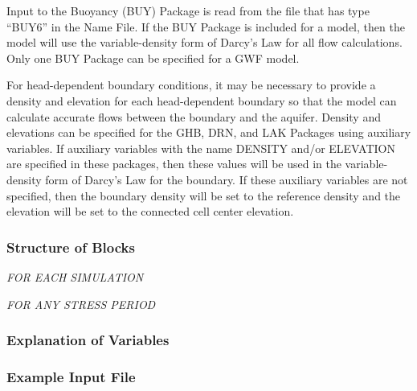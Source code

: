 Input to the Buoyancy (BUY) Package is read from the file that has type ``BUY6'' in the Name File.  If the BUY Package is included for a model, then the model will use the variable-density form of Darcy's Law for all flow calculations.  Only one BUY Package can be specified for a GWF model.

For head-dependent boundary conditions, it may be necessary to provide a density and elevation for each head-dependent boundary so that the model can calculate accurate flows between the boundary and the aquifer.  Density and elevations can be specified for the GHB, DRN, and LAK Packages using auxiliary variables.  If auxiliary variables with the name DENSITY and/or ELEVATION are specified in these packages, then these values will be used in the variable-density form of Darcy's Law for the boundary.  If these auxiliary variables are not specified, then the boundary density will be set to the reference density and the elevation will be set to the connected cell center elevation.

\vspace{5mm}
\subsubsection{Structure of Blocks}

\vspace{5mm}
\noindent \textit{FOR EACH SIMULATION}



\vspace{5mm}
\noindent \textit{FOR ANY STRESS PERIOD}


\vspace{5mm}
\subsubsection{Explanation of Variables}
\begin{description}

\end{description}

\vspace{5mm}
\subsubsection{Example Input File}



